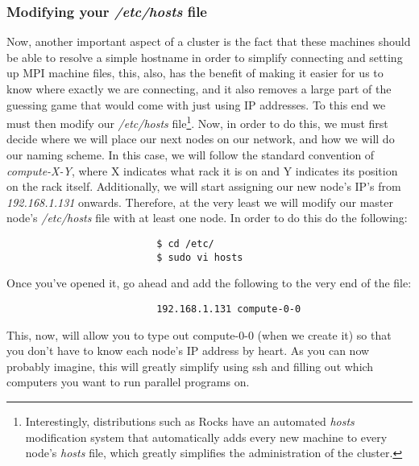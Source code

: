 \documentclass[]{article}
\begin{document}
                  \subsubsection{Modifying your \textit{/etc/hosts} file}
                  Now, another important aspect of a cluster is the fact that these machines should be able to resolve a simple hostname in order to
                  simplify connecting and setting up MPI machine files, this, also, has the benefit of making it easier for us to know where exactly we
                  are connecting, and it also removes a large part of the guessing game that would come with just using IP addresses. To this end we must 
                  then modify our \textit{/etc/hosts} file\footnote{Interestingly, distributions such as Rocks have an automated \textit{hosts} 
                      modification system that automatically adds every new machine to every node's \textit{hosts} file, which greatly simplifies the 
                          administration of the cluster.}. Now, in order to do this, we must first decide where we will place our next nodes on our network, and 
                          how we will do our naming scheme. In this case, we will follow the standard convention of \textit{compute-X-Y}, where X indicates what 
                          rack it is on and Y indicates its position on the rack itself. Additionally, we will start assigning our new node's IP's from 
                          \textit{192.168.1.131} onwards. Therefore, at the very least we will modify our master node's \textit{/etc/hosts} file with at least one
                          node. In order to do this do the following:
                          \begin{lstlisting}
                          $ cd /etc/
                          $ sudo vi hosts
                          \end{lstlisting}
                          Once you've opened it, go ahead and add the following to the very end of the file:
                          \begin{lstlisting}
                          192.168.1.131 compute-0-0
                          \end{lstlisting}
                          This, now, will allow you to type out compute-0-0 (when we create it) so that you don't have to know each node's IP address by heart. As
                          you can now probably imagine, this will greatly simplify using ssh and filling out which computers you want to run parallel programs on.
\end{document}
